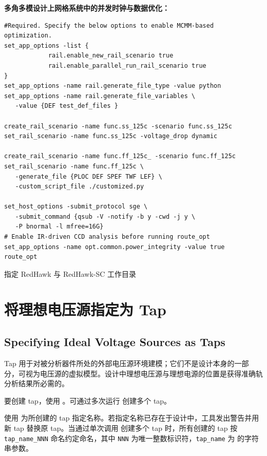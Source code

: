 \textbf{多角多模设计上网格系统中的并发时钟与数据优化：}
\begin{lstlisting}
#Required. Specify the below options to enable MCMM-based optimization.
set_app_options -list {
            rail.enable_new_rail_scenario true
            rail.enable_parallel_run_rail_scenario true
}
set_app_options -name rail.generate_file_type -value python
set_app_options -name rail.generate_file_variables \
   -value {DEF test_def_files }

create_rail_scenario -name func.ss_125c -scenario func.ss_125c
set_rail_scenario -name func.ss_125c -voltage_drop dynamic

create_rail_scenario -name func.ff_125c_ -scenario func.ff_125c
set_rail_scenario -name func.ff_125c \
   -generate_file {PLOC DEF SPEF TWF LEF} \
   -custom_script_file ./customized.py

set_host_options -submit_protocol sge \
   -submit_command {qsub -V -notify -b y -cwd -j y \
   -P bnormal -l mfree=16G}
# Enable IR-driven CCD analysis before running route_opt
set_app_options -name opt.common.power_integrity -value true
route_opt
\end{lstlisting}

\begin{seeAlsoBox}
指定 RedHawk 与 RedHawk-SC 工作目录
\end{seeAlsoBox}

\section{将理想电压源指定为 Tap}
\subsection*{Specifying Ideal Voltage Sources as Taps}

Tap 用于对被分析器件所处的外部电压源环境建模；它们不是设计本身的一部分，可视为电压源的虚拟模型。设计中理想电压源与理想电源的位置是获得准确轨分析结果所必需的。

要创建 tap，使用 。可通过多次运行  创建多个 tap。

使用  为所创建的 tap 指定名称。若指定名称已存在于设计中，工具发出警告并用新 tap 替换原 tap。当通过单次调用  创建多个 tap 时，所有创建的 tap 按 \texttt{tap\_name\_NNN} 命名约定命名，其中 \texttt{NNN} 为唯一整数标识符，\texttt{tap\_name} 为  的字符串参数。


